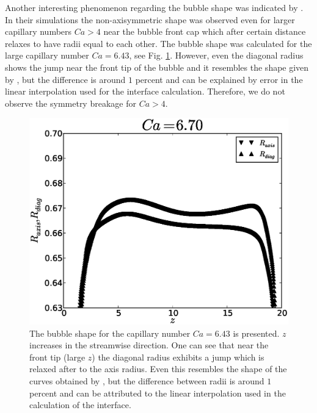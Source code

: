 \documentclass[preprint,12pt]{elsarticle}
\begin{document}
Another interesting phenomenon regarding the bubble shape was indicated by \citet{heil-threedim}. In
their simulations the non-axisymmetric shape was observed even for larger capillary numbers $Ca>4$
near
the bubble front cap which after certain distance relaxes to have radii equal to each other. The
bubble shape was calculated for the large capillary number $Ca=6.43$, see Fig.
\ref{fig:bubble:ca:large}. However, even the diagonal radius shows the jump near the front tip of
the bubble and it resembles the shape given by \citet{heil-threedim}, but the difference is around
$1$ percent and can be explained by error in the linear interpolation used for the
interface
calculation. Therefore, we do not observe the symmetry breakage for $Ca>4$. 
\begin{figure}[ht]
\includegraphics[width=\textwidth]{bubble_ca_large.eps}
\caption{The bubble shape for the capillary number $Ca=6.43$ is presented. $z$ increases in the
streamwise direction. One can see that near the front tip (large $z$) the diagonal radius exhibits
a jump which is relaxed after to the axis radius. Even this resembles
the shape of the curves obtained by \citet{heil-threedim}, but the
difference between radii is around $1$ percent and can be attributed to
the linear interpolation used in the calculation of the interface.\label{fig:bubble:ca:large}}
\end{figure}
\end{document}
